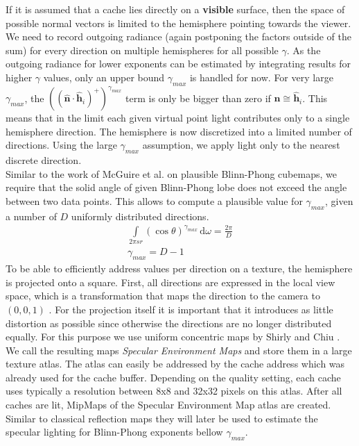 \documentclass[thesis.tex]{subfiles}
\begin{document}
If it is assumed that a cache lies directly on a \textbf{visible} surface, then the space of possible normal vectors is limited to the hemisphere pointing towards the viewer.
We need to record outgoing radiance (again postponing the factors outside of the sum) for every direction on multiple hemispheres for all possible $\gamma$.
As the outgoing radiance for lower exponents can be estimated by integrating results for higher $\gamma$ values, only an upper bound $\gamma_{max}$ is handled for now.
For very large $\gamma_{max}$, the $((\hat{\mathbf{n}} \cdot \hat{\mathbf{h}}_i)^+)^{\gamma_{max}}$ term is only be bigger than zero if $\hat{\mathbf{n}} \cong \hat{\mathbf{h}}_i$.
This means that in the limit each given virtual point light contributes only to a single hemisphere direction.
The hemisphere is now discretized into a limited number of directions.
Using the large $\gamma_{max}$ assumption, we apply light only to the nearest discrete direction.
\\
Similar to the work of McGuire et al. \cite{bib:envmipmap} on plausible Blinn-Phong cubemaps, we require that the solid angle of given Blinn-Phong lobe does not exceed the angle between two data points.
This allows to compute a plausible value for $\gamma_{max}$, given a number of $D$ uniformly distributed directions.
\begin{align}
\int\limits_{2\pi sr} (\cos\theta)^{\gamma_{max}}  \,\mathrm{d}\omega = \frac{2\pi}{D}\\
\gamma_{max} = D-1
\end{align}
%
To be able to efficiently address values per direction on a texture, the hemisphere is projected onto a square.
First, all directions are expressed in the local view space, which is a transformation that maps the direction to the camera to $(0,0,1)$ .
For the projection itself it is important that it introduces as little distortion as possible since otherwise the directions are no longer distributed equally.
For this purpose we use uniform concentric maps by Shirly and Chiu \cite{bib:concentricmaps}.
We call the resulting maps \emph{Specular Environment Maps} and store them in a large texture atlas.
The atlas can easily be addressed by the cache address which was already used for the cache buffer.
Depending on the quality setting, each cache uses typically a resolution between 8x8 and 32x32 pixels on this atlas.
After all caches are lit, MipMaps of the Specular Environment Map atlas are created.
Similar to classical reflection maps \cite[p.~308]{bib:RealtimeRenderingBook} they will later be used to estimate the specular lighting for Blinn-Phong exponents bellow $\gamma_{max}$.
\end{document}

